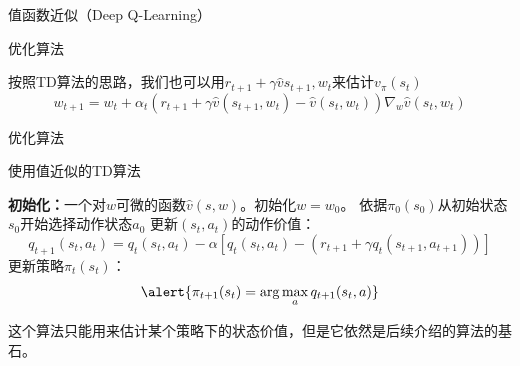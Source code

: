 \begin{section}{值函数近似\alert{（Deep Q-Learning）}}
\begin{frame}{优化算法}
\begin{itemize}
        按照TD算法的思路，我们也可以用$r_{t+1}+\gamma \hat{v}{s_{t+1},w_t}$来估计$v_\pi(s_t)$
        \[
            w_{t+1}=w_t+\alpha_t(r_{t+1}+\gamma \hat{v}(s_{t+1},w_t)-\hat{v}(s_t,w_t))\nabla_w\hat{v}(s_t,w_t)
        \]
    \end{itemize}
\end{frame}

\begin{frame}{优化算法}
    \begin{block}{使用值近似的TD算法}
        \begin{algorithmic}[1]
            \State \textbf{初始化：}一个对$w$可微的函数$\hat{v}(s,w)$。初始化$w=w_0$。
                \State 依据$\pi_0(s_0)$从初始状态$s_0$开始选择动作状态$a_0$
                    \State 更新$(s_t, a_t)$的动作价值：
                    \[
                        q_{t+1}(s_t,a_t)=q_t(s_t,a_t)-\alpha[q_t(s_t,a_t)-(r_{t+1}+\gamma q_t(s_{t+1},a_{t+1}))]
                    \]
                    \State \alert{更新策略$\pi_t(s_t)$}：
                    \[
                        \alert{\pi_{t+1}(s_t)=\arg\max_a q_{t+1}(s_t,a)}
                    \]
                \EndIf
            \EndFor
        \end{algorithmic}
    \end{block}
    这个算法只能用来估计某个策略下的状态价值，但是它依然是后续介绍的算法的基石。
\end{frame}

\end{section}